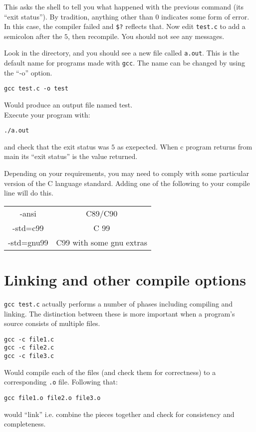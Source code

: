 This asks the shell to tell you what happened with the previous command (its ``exit status'').
By tradition, anything other than $0$ indicates some form of error.
In this case, the compiler failed and \verb!$?! reflects that.
Now edit \texttt{test.c} to add a semicolon after the $5$, then recompile.
You should not see any messages.

Look in the directory, and you should see a new file called \texttt{a.out}.
This is the default name for programs made with \texttt{gcc}. The name can be changed
by using the ``-o'' option. 

\begin{verbatim}
gcc test.c -o test
\end{verbatim}
Would produce an output file named test.
\\
Execute your program with:
\begin{verbatim}
./a.out 
\end{verbatim}
and check that the exit status was $5$ as exepected. When c program returns from main its ``exit status'' is the value returned.

Depending on your requirements, you may need to comply with some particular version of the C language standard.
Adding one of the following to your compile line will do this.

\begin{tabular}{c|c}
-ansi & C89/C90 \\
-std=c99 & C 99 \\
-std=gnu99 & C99 with some gnu extras\\
\end{tabular}


\section{Linking and other compile options}
\texttt{gcc test.c} actually performs a number of phases including compiling and linking.
The distinction between these is more important when a program's source consists of multiple 
files.
\begin{verbatim}
gcc -c file1.c
gcc -c file2.c
gcc -c file3.c
\end{verbatim}
Would compile each of the files (and check them for correctness) to a corresponding \texttt{.o} file.
Following that:
\begin{verbatim}
gcc file1.o file2.o file3.o 
\end{verbatim}
would ``link'' i.e. combine the pieces together and check for consistency and completeness.

